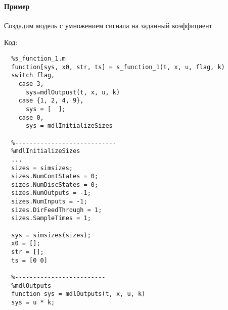 \paragraph{Пример}\mbox{}\par
Создадим модель с умножением сигнала на заданный коэффициент

Код:
\begin{verbatim}
  %s_function_1.m 
  function[sys, x0, str, ts] = s_function_1(t, x, u, flag, k)
  switch flag,
    case 3,
      sys=mdlOutpust(t, x, u, k)
    case {1, 2, 4, 9},
      sys = [  ];
    case 0,
      sys = mdlInitializeSizes

  %----------------------------
  %mdlInitializeSizes
  ...
  sizes = simsizes;
  sizes.NumContStates = 0;
  sizes.NumDiscStates = 0;
  sizes.NumOutputs = -1;
  sizes.NumInputs = -1;
  sizes.DirFeedThrough = 1;
  sizes.SampleTimes = 1;

  sys = simsizes(sizes);
  x0 = [];
  str = [];
  ts = [0 0]

  %-------------------------
  %mdlOutputs
  function sys = mdlOutputs(t, x, u, k)
  sys = u * k;

\end{verbatim}

